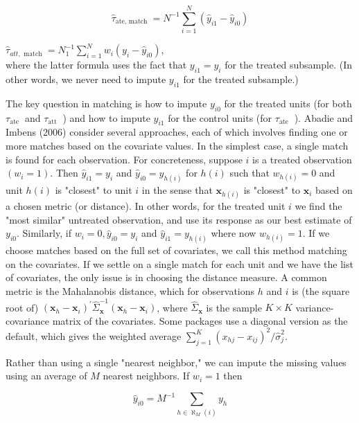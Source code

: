 \documentclass[10pt]{article}
\begin{document}
\begin{equation*}
\hat{\tau}_{\text {ate, match }}=N^{-1} \sum_{i=1}^{N}\left(\hat{y}_{i 1}-\hat{y}_{i 0}\right) \tag{21.56}
\end{equation*}


$\hat{\tau}_{a t t, \text { match }}=N_{1}^{-1} \sum_{i=1}^{N} w_{i}\left(y_{i}-\hat{y}_{i 0}\right)$,\\
where the latter formula uses the fact that $y_{i 1}=y_{i}$ for the treated subsample. (In other words, we never need to impute $y_{i 1}$ for the treated subsample.)

The key question in matching is how to impute $y_{i 0}$ for the treated units (for both $\tau_{\text {ate }}$ and $\tau_{\text {att }}$ ) and how to impute $y_{i 1}$ for the control units (for $\tau_{\text {ate }}$ ). Abadie and Imbens (2006) consider several approaches, each of which involves finding one or more matches based on the covariate values. In the simplest case, a single match is found for each observation. For concreteness, suppose $i$ is a treated observation $\left(w_{i}=1\right)$. Then $\hat{y}_{i 1}=y_{i}$ and $\hat{y}_{i 0}=y_{h(i)}$ for $h(i)$ such that $w_{h(i)}=0$ and unit $h(i)$ is "closest" to unit $i$ in the sense that $\mathbf{x}_{h(i)}$ is "closest" to $\mathbf{x}_{i}$ based on a chosen metric (or distance). In other words, for the treated unit $i$ we find the "most similar" untreated observation, and use its response as our best estimate of $y_{i 0}$. Similarly, if $w_{i}=0, \hat{y}_{i 0}=y_{i}$ and $\hat{y}_{i 1}=y_{h(i)}$ where now $w_{h(i)}=1$. If we choose matches based on the full set of covariates, we call this method matching on the covariates. If we settle on a single match for each unit and we have the list of covariates, the only issue is in choosing the distance measure. A common metric is the Mahalanobis distance, which for observations $h$ and $i$ is (the square root of) $\left(\mathbf{x}_{h}-\mathbf{x}_{i}\right)^{\prime} \hat{\Sigma}_{\mathbf{x}}^{-1}\left(\mathbf{x}_{h}-\mathbf{x}_{i}\right)$, where $\hat{\Sigma}_{\mathbf{x}}$ is the sample $K \times K$ variance-covariance matrix of the covariates. Some packages use a diagonal version as the default, which gives the weighted average $\sum_{j=1}^{K}\left(x_{h j}-x_{i j}\right)^{2} / \hat{\sigma}_{j}^{2}$.

Rather than using a single "nearest neighbor," we can impute the missing values using an average of $M$ nearest neighbors. If $w_{i}=1$ then


\begin{equation*}
\hat{y}_{i 0}=M^{-1} \sum_{h \in \aleph_{M}(i)} y_{h} \tag{21.58}
\end{equation*}
\end{document}
